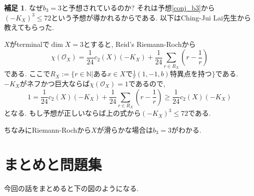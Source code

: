 \documentclass[dvipdfmx]{msjproc}
\theoremstyle{definition}
\newtheorem{rema}[thm]{補足}
\newcommand{\N}{\mathbb{N}}
\begin{document}
\begin{rema}
なぜ$b_3=3$と予想されているのか? それは予想\ref{conj_b3}から$(-K_X)^3 \le 72$という予想が導かれるからである.
以下はChing-Jui Lai先生から教えてもらった.

$X$がterminalで$\dim X =3$とすると, Reid's Riemann-Rochから
$$
\chi(\mathcal{O}_{X})
=
\frac{1}{24}c_2(X) (-K_X)
+ \frac{1}{24}\sum_{r \in R_X} \left(r - \frac{1}{r} \right)
$$
である. ここで$R_X := \{ r \in \N | \text{ある$x \in X$で$\frac{1}{r}(1,-1,b)$特異点を持つ} \}$である.
$-K_X$がネフかつ巨大ならば$\chi(\mathcal{O}_{X})=1$であるので, 
$$
1 = \frac{1}{24}c_2(X) (-K_X)
+ \frac{1}{24}\sum_{r \in R_X} \left(r - \frac{1}{r} \right)
\ge \frac{1}{24}c_2(X) (-K_X)
$$
となる. もし予想が正しいならば上の式から$(-K_X)^{3} \le 72$である.

ちなみにRiemann-Rochから$X$が滑らかな場合は$b_3=3$がわかる.
\end{rema}

\section{まとめと問題集}

今回の話をまとめると下の図のようになる.
\end{document}
